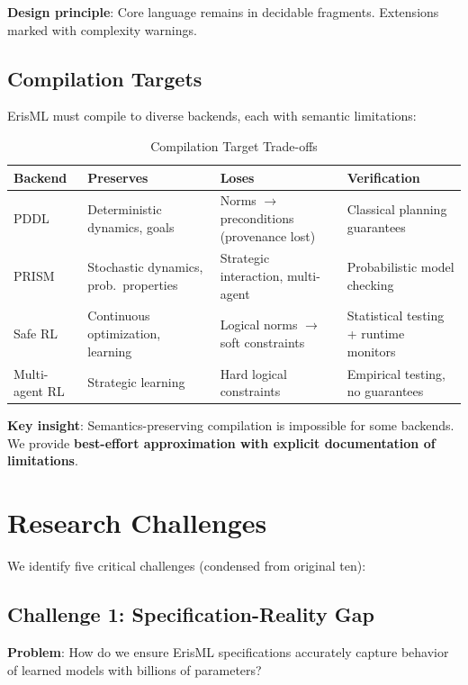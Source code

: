 \documentclass[conference]{IEEEtran}
\begin{document}
\textbf{Design principle}: Core language remains in decidable fragments.
Extensions marked with complexity warnings.

\subsection{Compilation Targets}

ErisML must compile to diverse backends, each with semantic limitations:

\begin{table}[t]
\caption{Compilation Target Trade-offs}
\label{tab:backends}
\centering
\footnotesize
\begin{tabular}{@{}p{1.2cm}p{1.6cm}p{1.4cm}p{2.4cm}@{}}
\toprule
Backend & Preserves & Loses & Verification \\
\midrule
PDDL & Deterministic dynamics, goals & Norms $\to$ preconditions (provenance lost) & Classical planning guarantees \\
PRISM & Stochastic dynamics, prob.\ properties & Strategic interaction, multi-agent & Probabilistic model checking \\
Safe RL & Continuous optimization, learning & Logical norms $\to$ soft constraints & Statistical testing + runtime monitors \\
Multi-agent RL & Strategic learning & Hard logical constraints & Empirical testing, no guarantees \\
\bottomrule
\end{tabular}
\end{table}

\textbf{Key insight}: Semantics-preserving compilation is impossible for
some backends. We provide \textbf{best-effort approximation with
explicit documentation of limitations}.

\section{Research Challenges}
\label{sec:challenges}

We identify five critical challenges (condensed from original ten):

\subsection{Challenge 1: Specification-Reality Gap}

\textbf{Problem}: How do we ensure ErisML specifications accurately
capture behavior of learned models with billions of parameters?
\end{document}
